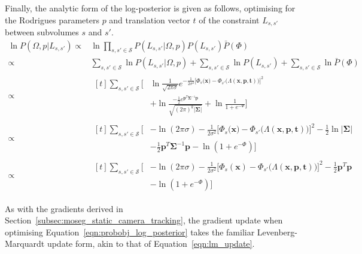 Finally, the analytic form of the log-posterior is given as follows, optimising
for the Rodrigues parameters \(p\) and translation vector \(t\) of the constraint
\(L_{s, s'}\) between subvolumes \(s\) and \(s'\).
\begin{align}
\label{eqn:probobj_log_posterior}
  \ln P(\Omega, p | L_{s, s'}) \propto{}& \ln
  \prod_{s, s' \in \mathcal{S}} P(L_{s, s'} | \Omega, p)P(L_{s, s'})\bar{P}(\Phi)\\
  \propto& \sum_{s, s' \in \mathcal{S}} \ln P(L_{s, s'} | \Omega, p) +
  \sum_{s, s' \in \mathcal{S}} \ln P(L_{s, s'}) +
  \sum_{s, s' \in \mathcal{S}} \ln \bar{P}(\Phi)\\
  \propto& 
  \begin{aligned}[t]
    \sum_{s, s' \in \mathcal{S}} \Bigg[ {}& \ln \frac{1}{\sqrt{2 \pi \sigma}}
    e^{-\frac{1}{2\sigma^{2}}\Big[
        \Phi_{s}\big(\bm{x}\big) - \Phi_{s'} \big(\Lambda(\bm{x}, \bm{p}, \bm{t})\big){ 
      \Big ] }^{2}
    }\\
    &+ \ln \frac{-\frac{1}{2} e^{\bm{p}^{T}\bm{\Sigma}^{-1}\bm{p}}}
    {\sqrt{{(2\pi)}^{k}\left|\bm{\Sigma}\right|}} +
    \ln \frac{1}{1 + e^{-\Phi}}\Bigg]
  \end{aligned}\\
  \propto& 
  \begin{aligned}[t]
    \sum_{s, s' \in \mathcal{S}} \Bigg[ {}& -\ln(2\pi\sigma) -
    \frac{1}{2\sigma^{2}}{\Big[
      \Phi_{s}\big(\bm{x}\big) - \Phi_{s'}\big(\Lambda(\bm{x}, \bm{p}, \bm{t})\big)
    \Big]}^{2} -
    \frac{1}{2} \ln \left|\bm{\Sigma}\right| \\
    & - \frac{1}{2} \bm{p}^{T}\bm{\Sigma}^{-1}\bm{p} -
    \ln(1 + e^{-\Phi}) \Bigg]
  \end{aligned}\\
  \propto& 
  \begin{aligned}[t]
    \sum_{s, s' \in \mathcal{S}} \Bigg[ {}& -\ln(2\pi\sigma) -
    \frac{1}{2\sigma^{2}}{\Big[
      \Phi_{s}(\bm{x}) - \Phi_{s'}\big(\Lambda(\bm{x}, \bm{p}, \bm{t})\big)
    \Big]}^{2} -
    \frac{1}{2} \bm{p}^{T}\bm{p} \\
    & - \ln(1 + e^{-\Phi}) \Bigg]
\end{aligned}
\end{align}

As with the gradients derived in Section~\ref{subsec:moseg_static_camera_tracking}, the 
gradient update when optimising Equation~\ref{eqn:probobj_log_posterior} takes the familiar 
Levenberg-Marquardt update form, akin to that of Equation~\ref{eqn:lm_update}.

